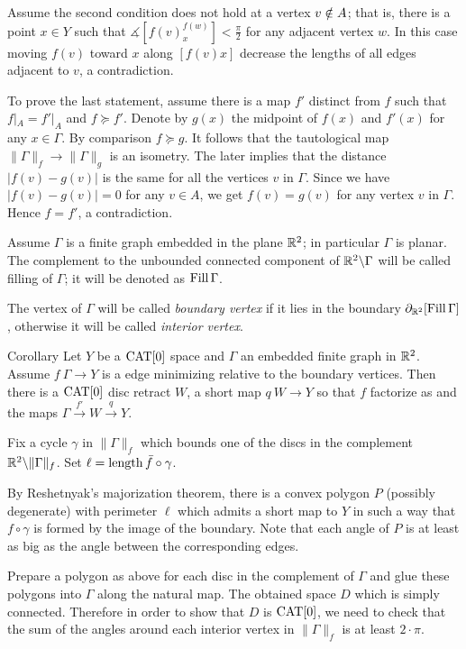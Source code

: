 \documentclass{article}
\begin{document}
Assume the second condition does not hold at a vertex $v\zz\notin A$;
that is, there is a point $x\in Y$ such that
$\measuredangle[f(v)^{f(w)}_x]< \tfrac\pi2$
for any adjacent vertex $w$.
In this case moving $f(v)$ toward $x$ along $[f(v)x]$ decrease the lengths of all edges adjacent to $v$, a contradiction.


To prove the last statement, assume there is a map $f'$ distinct from $f$ such that $f|_A=f'|_A$ and $f\succcurlyeq f'$.
Denote by $g(x)$ the midpoint of $f(x)$ and $f'(x)$ for any $x\in \Gamma$. 
By comparison $f\succcurlyeq g$.
It follows that the tautological map $\|\Gamma\|_f\to \|\Gamma\|_g$ is an isometry.
The later implies that the distance $|f(v)-g(v)|$ is the same for all the vertices $v$ in $\Gamma$.
Since we have $|f(v)-g(v)|=0$ for any $v\in A$,
we get $f(v)=g(v)$ for any vertex $v$ in $\Gamma$.
Hence $f=f'$, a contradiction.
\qeds

Assume $\Gamma$ is a finite graph embedded in the plane $\mathbb{R}^2$;
in particular $\Gamma$ is planar.
The complement to the unbounded connected component of $\mathbb{R}^2\backslash\Gamma$ will be called filling of $\Gamma$;
it will be denoted as $\mathop{\rm Fill}\Gamma$.

The vertex of $\Gamma$ will be called \emph{boundary vertex}
if it lies in the boundary $\partial_{\mathbb{R}^2}[\mathop{\rm Fill}\Gamma]$,
otherwise it will be called \emph{interior vertex}.

\begin{thm}{Corollary}\label{cor:planar-minimizing-graph}
Let $Y$ be a $\mathop{\rm CAT}\nolimits[0]$ space and
$\Gamma$ an embedded finite graph in $\mathbb{R}^2$.
Assume $f\:\Gamma\to Y$ is a edge minimizing relative to the boundary vertices. 
Then there is a $\mathop{\rm CAT}\nolimits[0]$ disc retract $W$,
a short map $q\:W\to Y$ so that $f$ factorize as
and the maps $\Gamma\xrightarrow{f'} W \xrightarrow{q} Y$.
\end{thm}


Fix a cycle $\gamma$ in $\|\Gamma\|_f$ which bounds one of the discs in the complement $\mathbb{R}^2\backslash \|\Gamma\|_f$.
Set $\ell=\mathop{\rm length}\nolimits \bar f\circ\gamma$.

By Reshetnyak's majorization theorem, there is a convex polygon $P$ (possibly degenerate) with perimeter $\ell$ which admits 
a short map to $Y$ in such a way that $f\circ\gamma$ is formed by the image of the boundary.
Note that each angle of $P$ is at least as big as 
the angle between the corresponding edges.

Prepare a polygon as above for each disc in the complement of $\Gamma$
and glue these polygons into $\Gamma$ along the natural map.
The obtained space $D$ which is simply connected.
Therefore in order to show that $D$ is $\mathop{\rm CAT}\nolimits[0]$,
we need to check that the sum of the angles around each interior vertex in $\|\Gamma\|_f$ is at least $2\cdot\pi$.
\end{document}
